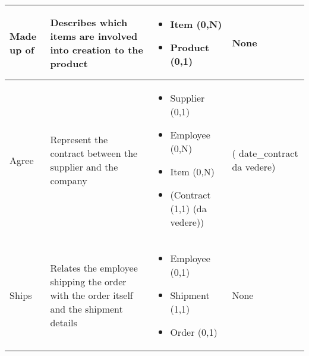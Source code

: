 \begin{longtable}{|p{}|p{} |p{}|p{} |}
Made up of & Describes which items are involved into creation to the product & \begin{itemize}
	\vspace{-1em}
	\item Item (0,N)
	\item Product (0,1)
\end{itemize}
&  None \\\hline

Agree & Represent the contract between the supplier and the company  & \begin{itemize}
	\vspace{-1em}
	\item Supplier (0,1) 
	\item Employee (0,N)
	\item Item    (0,N)
    \item (Contract  (1,1) (da vedere))
	\end{itemize}
&  ( date\_contract da vedere)\\\hline

Ships & Relates the employee shipping the order with the order itself and the shipment details & \begin{itemize}
	\vspace{-1em}
	\item Employee (0,1)
	\item Shipment (1,1)
	\item Order (0,1)
\end{itemize}
&  None \\\hline
\end{longtable}